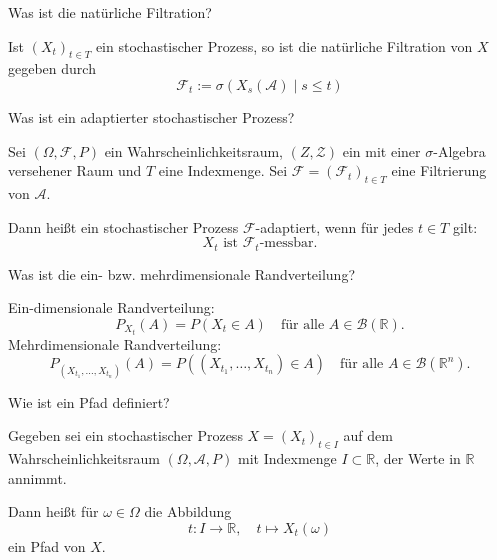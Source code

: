 \begin{QandA}
    \item Was ist die natürliche Filtration?
    \begin{answered}
        Ist $(X_{t})_{t\in T}$ ein stochastischer Prozess, so ist die natürliche Filtration von $X$ gegeben durch
        \[
            \mathcal{F}_{t}:=\sigma ({X_{s}({\mathcal{A}}) \mid s\leq t})
        \]
    \end{answered}

    \item Was ist ein adaptierter stochastischer Prozess?
    \begin{answered}
        Sei $(\Omega, \mathcal{F}, P)$ ein Wahrscheinlichkeitsraum, $(Z, \mathcal{Z})$ ein mit einer $\sigma$-Algebra versehener Raum und $T$ eine Indexmenge.
        Sei $\mathcal{F} = ({\mathcal{F}}_{t})_{t\in T}$ eine Filtrierung von $\mathcal{A}$.

        Dann heißt ein stochastischer Prozess $\mathcal{F}$-adaptiert, wenn für jedes $t \in T$ gilt:
        \[
            X_t \text{ ist }{\mathcal{F}}_{t}\text{-messbar}.
        \]
    \end{answered}

    \item Was ist die ein- bzw. mehrdimensionale Randverteilung?
    \begin{answered}
        Ein-dimensionale Randverteilung:
        \[
            P_{X_{t}}(A) = P(X_{t} \in A) \quad \text{für alle } A \in \mathcal{B}(\mathbb{R}).
        \]
        Mehrdimensionale Randverteilung:
        \[
            P_{(X_{t_1}, \ldots, X_{t_n})}(A) = P((X_{t_1}, \ldots, X_{t_n}) \in A) \quad \text{für alle } A \in \mathcal{B}(\mathbb{R}^n).
        \]
    \end{answered}

    \item Wie ist ein Pfad definiert?
    \begin{answered}
        Gegeben sei ein stochastischer Prozess $X=(X_{t})_{t\in I}$ auf dem Wahrscheinlichkeitsraum $(\Omega ,{\mathcal{A}},P)$ mit Indexmenge $I\subset \mathbb{R}$, der Werte in $\mathbb{R}$ annimmt.

        Dann heißt für $\omega \in \Omega$ die Abbildung
        \[
            t: I \to \mathbb{R}, \quad t\mapsto X_{t}(\omega)
        \]
        ein Pfad von $X$.
    \end{answered}


\end{QandA}
